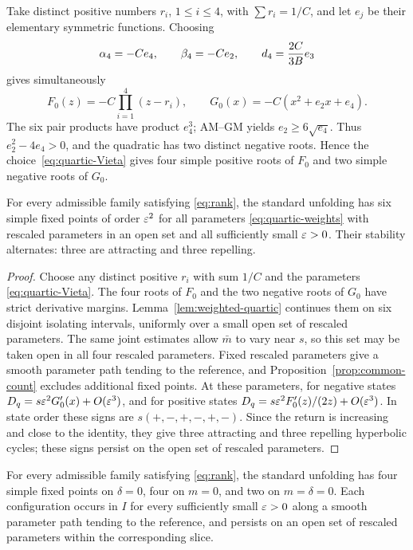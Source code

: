 Take distinct positive numbers \(r_i\), \(1\le i\le4\), with
\(\sum r_i=1/C\), and let \(e_j\) be their elementary symmetric
functions. Choosing
\begin{equation}\label{eq:quartic-Vieta}
 \alpha_4=-Ce_4,\qquad \beta_4=-Ce_2,\qquad d_4=\frac{2C}{3B}e_3
\end{equation}
gives simultaneously
\[
 F_0(z)=-C\prod_{i=1}^4(z-r_i),\qquad
 G_0(x)=-C(x^2+e_2x+e_4).
\]
The six pair products have product \(e_4^3\); AM--GM yields
\(e_2\ge6\sqrt{e_4}\). Thus \(e_2^2-4e_4>0\), and the quadratic
has two distinct negative roots. Hence the choice~\eqref{eq:quartic-Vieta}
gives four simple positive roots of \(F_0\) and two simple negative roots
of \(G_0\).

\begin{proposition}
\label{prop:single-scale-six}
For every admissible family satisfying \eqref{eq:rank}, the standard
unfolding has six simple fixed points of order $\varepsilon^2$ for all parameters
\eqref{eq:quartic-weights} with rescaled parameters in an open set and all
sufficiently small $\varepsilon>0$. Their stability alternates: three are attracting
and three repelling.
\end{proposition}

\begin{proof}
Choose any distinct positive $r_i$ with sum $1/C$ and the parameters
\eqref{eq:quartic-Vieta}. The four roots of $F_0$ and the two negative
roots of $G_0$ have strict derivative margins. Lemma~\ref{lem:weighted-quartic}
continues them on six disjoint isolating intervals, uniformly over a small
open set of rescaled parameters. The same joint estimates allow \(\bar m\) to
vary near \(s\), so this set may be taken open in all four rescaled
parameters. Fixed rescaled parameters give a smooth parameter path tending to
the reference, and Proposition~\ref{prop:common-count} excludes additional
fixed points. At these parameters, for negative states $D_q=s\varepsilon^2G_0'(x)+O(\varepsilon^3)$, and for positive
states $D_q=s\varepsilon^2F_0'(z)/(2z)+O(\varepsilon^3)$. In state order these signs
are $s(+,-,+,-,+,-)$. Since the return is increasing and close to the
identity, they give three attracting and three repelling hyperbolic cycles;
these signs persist on the open set of rescaled parameters.
\end{proof}

\begin{proposition}
\label{prop:sharp-slice-attainment}
For every admissible family satisfying \eqref{eq:rank}, the standard unfolding
has four simple fixed points on \(\delta=0\), four on \(m=0\), and two on
\(m=\delta=0\). Each configuration occurs in \(I\) for every sufficiently
small \(\varepsilon>0\) along a smooth parameter path tending to the reference, and
persists on an open set of rescaled parameters within the corresponding slice.
\end{proposition}

